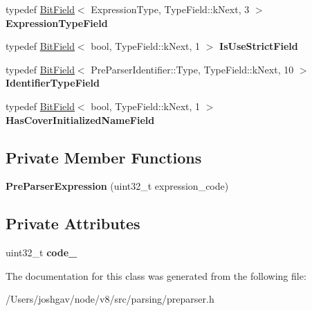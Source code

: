 \begin{DoxyCompactItemize}
\item 
typedef \hyperlink{classv8_1_1internal_1_1_bit_field}{Bit\+Field}$<$ Expression\+Type, Type\+Field\+::k\+Next, 3 $>$ {\bfseries Expression\+Type\+Field}\hypertarget{classv8_1_1internal_1_1_pre_parser_expression_ab021dc5719a21ef8a127674e6a240376}{}\label{classv8_1_1internal_1_1_pre_parser_expression_ab021dc5719a21ef8a127674e6a240376}

\item 
typedef \hyperlink{classv8_1_1internal_1_1_bit_field}{Bit\+Field}$<$ bool, Type\+Field\+::k\+Next, 1 $>$ {\bfseries Is\+Use\+Strict\+Field}\hypertarget{classv8_1_1internal_1_1_pre_parser_expression_a35963e2673b67551534798384b22c8d1}{}\label{classv8_1_1internal_1_1_pre_parser_expression_a35963e2673b67551534798384b22c8d1}

\item 
typedef \hyperlink{classv8_1_1internal_1_1_bit_field}{Bit\+Field}$<$ Pre\+Parser\+Identifier\+::\+Type, Type\+Field\+::k\+Next, 10 $>$ {\bfseries Identifier\+Type\+Field}\hypertarget{classv8_1_1internal_1_1_pre_parser_expression_a515e27dbbb3474c59835791f9d5c4ed2}{}\label{classv8_1_1internal_1_1_pre_parser_expression_a515e27dbbb3474c59835791f9d5c4ed2}

\item 
typedef \hyperlink{classv8_1_1internal_1_1_bit_field}{Bit\+Field}$<$ bool, Type\+Field\+::k\+Next, 1 $>$ {\bfseries Has\+Cover\+Initialized\+Name\+Field}\hypertarget{classv8_1_1internal_1_1_pre_parser_expression_a080840816cf2cd436dd9605debca9633}{}\label{classv8_1_1internal_1_1_pre_parser_expression_a080840816cf2cd436dd9605debca9633}

\end{DoxyCompactItemize}
\subsection*{Private Member Functions}
\begin{DoxyCompactItemize}
\item 
{\bfseries Pre\+Parser\+Expression} (uint32\+\_\+t expression\+\_\+code)\hypertarget{classv8_1_1internal_1_1_pre_parser_expression_a11dc64232cdde64c1a262f80d91c9c5d}{}\label{classv8_1_1internal_1_1_pre_parser_expression_a11dc64232cdde64c1a262f80d91c9c5d}

\end{DoxyCompactItemize}
\subsection*{Private Attributes}
\begin{DoxyCompactItemize}
\item 
uint32\+\_\+t {\bfseries code\+\_\+}\hypertarget{classv8_1_1internal_1_1_pre_parser_expression_a87923d60ac303bd3d105125c91ff65d0}{}\label{classv8_1_1internal_1_1_pre_parser_expression_a87923d60ac303bd3d105125c91ff65d0}

\end{DoxyCompactItemize}


The documentation for this class was generated from the following file\+:\begin{DoxyCompactItemize}
\item 
/\+Users/joshgav/node/v8/src/parsing/preparser.\+h\end{DoxyCompactItemize}
